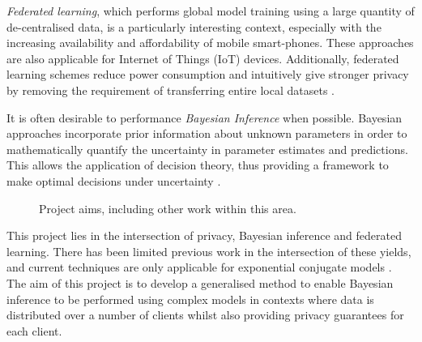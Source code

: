 \emph{Federated learning}, which performs global model training using a large quantity of de-centralised data, is a particularly interesting context, especially with the increasing availability and affordability of mobile smart-phones. These approaches are also applicable for Internet of Things (IoT) devices. Additionally, federated learning schemes reduce power consumption and intuitively give stronger privacy by removing the requirement of transferring entire local datasets \citep{google_ai_blog_2017}. 

It is often desirable to performance \emph{Bayesian Inference} when possible. Bayesian approaches incorporate prior information about unknown parameters in order to mathematically quantify the uncertainty in parameter estimates and predictions. This allows the application of decision theory, thus providing a framework to make optimal decisions under uncertainty \citep{Bishop:2006}.

\begin{figure}
	
	\label{fig:intro:venn}
	\centering
	\caption{Project aims, including other work within this area. }
\end{figure} 

This project lies in the intersection of privacy, Bayesian inference and federated learning. There has been limited previous work in the intersection of these yields, and current techniques are only applicable for exponential conjugate models \citep{heikkila2017differentially}. The aim of this project is to develop a generalised method to enable Bayesian inference to be performed using complex models in contexts where data is distributed over a number of clients whilst also providing privacy guarantees for each client. 
